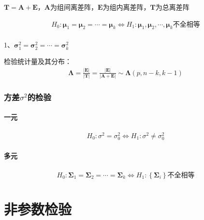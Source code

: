 \documentclass[12pt]{book}
\begin{document}
$\mathbf{T}=\mathbf{A}+\mathbf{E}$，$\mathbf{A}$为组间离差阵，$\bm{E}$为组内离差阵，$\bm{T}$为总离差阵

\begin{gather*}
    H_0:\bm{\mu}_1=\bm{\mu}_2=\cdots=\bm{\mu}_k	\Leftrightarrow H_1:\bm{\mu}_1,\bm{\mu}_2,\cdots,\bm{\mu}_k不全相等 \\
\end{gather*}


1、$\bm{\sigma}_1^2=\bm{\sigma}_2^2=\cdots=\bm{\sigma}_k^2$

检验统计量及其分布：
\begin{gather*}
    \bm{\Lambda}=\frac{\left|\bm{E}\right|}{\left|\bm{T}\right|}=\frac{\left|\bm{E}\right|}{\left|\bm{A}+\bm{E}\right|} \sim\bm{\Lambda}(p,n-k,k-1)
\end{gather*}


\subsubsection{方差$\sigma^2$的检验}

\paragraph{一元}

\begin{gather*}
    H_0:\sigma^2=\sigma_0^2 \Leftrightarrow	H_1:\sigma^2\neq\sigma_0^2
\end{gather*}


\paragraph{多元}

\begin{gather*}
    H_0:\bm{\Sigma}_1=\bm{\Sigma}_2=\cdots=\bm{\Sigma}_k\Leftrightarrow H_1:\left\{\bm{\Sigma}_i\right\}\text{不全相等}
\end{gather*}















\section{非参数检验}
\end{document}
